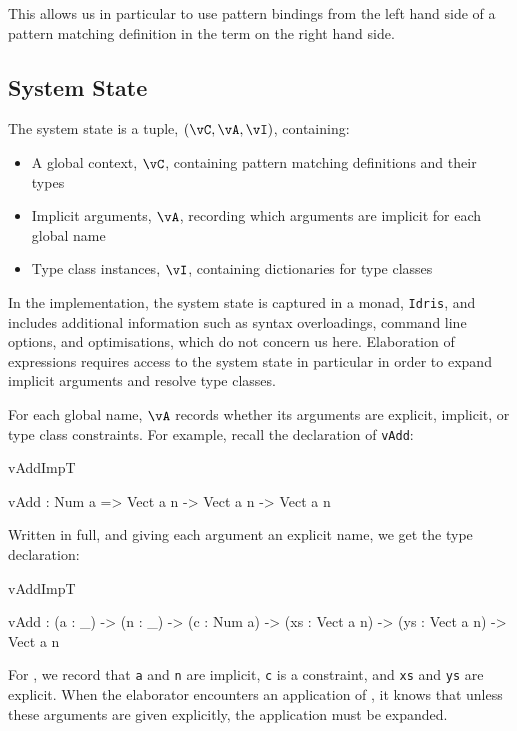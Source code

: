 This allows us in particular to use pattern bindings from the left hand side of a pattern
matching definition in the term on the right hand side.

\subsection{System State}

The system state is a tuple, $(\vC,\vA,\vI)$, containing:

\begin{itemize}
\item A global context, $\vC$, containing pattern matching definitions and their types
\item Implicit arguments, $\vA$, recording which arguments are implicit for each global name
\item Type class instances, $\vI$, containing dictionaries for type classes
\end{itemize}

In the implementation, the system state is captured in a monad, \texttt{Idris}, and
includes additional information such as syntax overloadings,
command line options, and optimisations, which do not concern us here. Elaboration
of expressions requires access to the system state in particular in order to expand
implicit arguments and resolve type classes. 

For each global name, $\vA$ records whether its arguments are explicit, implicit,
or type class constraints.  For example, recall the declaration
of \texttt{vAdd}:

\begin{SaveVerbatim}{vAddImpT}

vAdd : Num a => Vect a n -> Vect a n -> Vect a n

\end{SaveVerbatim}

\noindent
Written in full, and giving each argument an explicit name, we get the
type declaration:

\begin{SaveVerbatim}{vAddImpT}

vAdd : (a : _) -> (n : _) -> (c : Num a) -> 
       (xs : Vect a n) -> (ys : Vect a n) -> Vect a n

\end{SaveVerbatim}

\noindent
For , we record that \texttt{a} and \texttt{n} are implicit, 
\texttt{c} is a constraint, and \texttt{xs} and \texttt{ys} are explicit. When
the elaborator encounters an application of , it knows that unless these arguments
are given explicitly, the application must be expanded.

